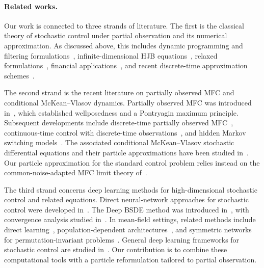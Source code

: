 \documentclass[11pt]{article}
\numberwithin{equation}{section}
\theoremstyle{plain}
\theoremstyle{definition}
\theoremstyle{remark}
\begin{document}
	\paragraph{Related works.}
	\begin{sloppypar}
	Our work is connected to three strands of literature. The first is the classical theory of stochastic control under partial observation and its numerical approximation. As discussed above, this includes dynamic programming and filtering formulations~\cite{davis1973dynamic, fleming1980measure, bensoussan1992stochastic}, infinite-dimensional HJB equations~\cite{lions1989viscosity, gozzi2000hamilton}, relaxed formulations~\cite{el1988existence}, financial applications~\cite{pham2008portfolio, balata2019class}, and recent discrete-time approximation schemes~\cite{li2024discrete}.
	
	The second strand is the recent literature on partially observed MFC and conditional McKean--Vlasov dynamics. Partially observed MFC was introduced in~\cite{buckdahn2017mean}, which established wellposedness and a Pontryagin maximum principle. Subsequent developments include discrete-time partially observed MFC~\cite{wan2025discrete}, continuous-time control with discrete-time observations~\cite{bayer2024continuous}, and hidden Markov switching models~\cite{fuhrman2026optimal}. The associated conditional McKean--Vlasov stochastic differential equations and their particle approximations have been studied in~\cite{buckdahn2023general, du2024particle}. Our particle approximation for the standard control problem relies instead on the common-noise-adapted MFC limit theory of~\cite{bouchard2025limit}.
	\end{sloppypar}
	
	\begin{sloppypar}
	The third strand concerns deep learning methods for high-dimensional stochastic control and related equations. Direct neural-network approaches for stochastic control were developed in~\cite{han2016deep}. The Deep BSDE method was introduced in~\cite{han2018solving}, with convergence analysis studied in~\cite{han2020convergence}. In mean-field settings, related methods include direct learning~\cite{carmona2022convergence}, population-dependent architectures~\cite{dayanikli2023deep}, and symmetric networks for permutation-invariant problems~\cite{germain2022deepsets}. General deep learning frameworks for stochastic control are studied in~\cite{bachouch2022deep}. Our contribution is to combine these computational tools with a particle reformulation tailored to partial observation.
	\end{sloppypar}
	
\end{document}
